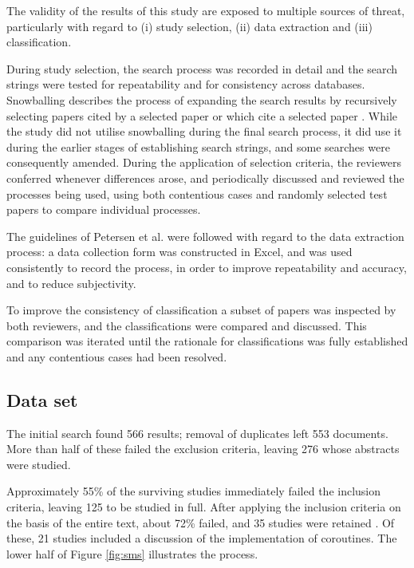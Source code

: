 \documentclass[format=acmsmall, review=false, screen=false]{acmart}
\begin{document}
The validity of the results of this study are exposed to multiple sources of threat, particularly with regard to (i) study selection, (ii) data extraction and (iii) classification.

During study selection, the search process was recorded in detail and the search strings were tested for repeatability and for consistency across databases. Snowballing describes the process of expanding the search results by recursively selecting papers cited by a selected paper or which cite a selected paper \cite{Kitchenham2011a, Petersen2015}. While the study did not utilise snowballing during the final search process, it did use it during the earlier stages of establishing search strings, and some searches were consequently amended. During the application of selection criteria, the reviewers conferred whenever differences arose, and periodically discussed and reviewed the processes being used, using both contentious cases and randomly selected test papers to compare individual processes.

The guidelines of Petersen et al. \cite{Petersen2008, Petersen2015} were followed with regard to the data extraction process: a data collection form was constructed in Excel, and was used consistently to record the process, in order to improve repeatability and accuracy, and to reduce subjectivity.

To improve the consistency of classification a subset of papers was inspected by both reviewers, and the classifications were compared and discussed. This comparison was iterated until the rationale for classifications was fully established and any contentious cases had been resolved.

\subsection{Data set}

The initial search found 566 results; removal of duplicates left 553 documents. More than half of these failed the exclusion criteria, leaving 276 whose abstracts were studied.

Approximately 55\% of the surviving studies immediately failed the inclusion criteria, leaving 125 to be studied in full. After applying the inclusion criteria on the basis of the entire text, about 72\% failed, and 35 studies were retained \cite{Alvira2013, Andalam2014, Andersen2016, Andersen2017b, Bergel2011, Boers2010, Clark2009, Cohen2007b, Durmaz2017, Elsts2017, Evers2007, Fritzsche2010, Glistvain2010, Inam2011, Jaaskelainen2008, Jahier2016, Kalebe2017, Karpin2007, Khezri2008, Kugler2013, Kumar2007, Liu2011, Lohmann2012, Motika2015, Niebert2014, Noman2017, Oldewurtel2009, Park2015, Riedel2010, Schimpf2012b, St-Amour2010, Strube2010, Susilo2009, VonHanxleden2009, Yu2008}. Of these, 21 studies included a discussion of the implementation of coroutines. The lower half of Figure \ref{fig:sms} illustrates the process.
\end{document}
